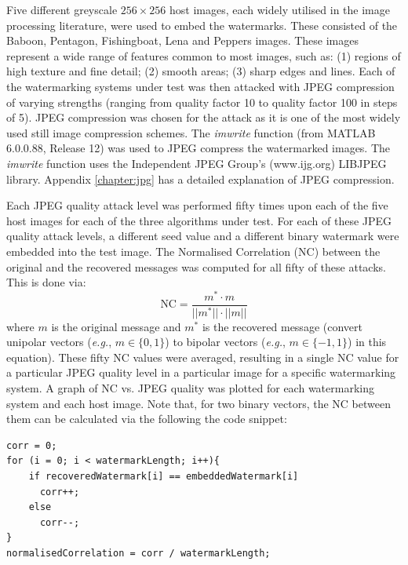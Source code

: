 \documentclass[12pt]{report}
\renewcommand{\baselinestretch}{1.5}
\begin{document}
Five different greyscale $256\times 256$ host images, each widely utilised in the image processing literature, were used to embed
the watermarks. 
These consisted of the Baboon, Pentagon, Fishingboat, Lena and Peppers images. These images represent a wide range of features
common to most images, such as: (1) regions of high texture and fine detail; (2) smooth areas; (3) sharp edges and lines.
Each of the watermarking systems under test was then attacked with JPEG compression 
of varying strengths (ranging from quality factor 10 to quality factor 100 in steps of 5). 
JPEG compression was chosen for the attack as it is one of the most widely used still image compression schemes.
The \emph{imwrite} function (from MATLAB 6.0.0.88, Release 12) was used
to JPEG compress the watermarked images. The \emph{imwrite} function uses the Independent JPEG Group's (www.ijg.org) LIBJPEG library.
Appendix \ref{chapter:jpg} has a detailed explanation of JPEG compression.

Each JPEG quality attack level was performed fifty times upon each of the five host images for each of the three algorithms under test. 
For each of these JPEG quality attack levels, a different seed value and a
different binary watermark were embedded into the test image. The Normalised Correlation (NC) between the original 
and the recovered messages was computed for all fifty of these attacks. This is done via:
\begin{equation}
\label{eq:nc}
	\mbox{NC}= \frac {m^{*} \cdot m} {||m^{*}|| \cdot ||m||}
\end{equation}
where $m$ is the original message and $m^{*}$ is the recovered message (convert unipolar vectors 
(\emph{e.g.}, $m\in\{0,1\}$)
to bipolar vectors (\emph{e.g.}, $m\in\{-1,1\}$) in this equation).
These fifty NC values were averaged, resulting in a single NC value for 
a particular JPEG quality level in a particular image for a 
specific watermarking system. A graph of NC vs. JPEG quality was plotted for each watermarking system and each host image.
Note that, for two binary vectors, the NC between them can be calculated via the following the code snippet:
\footnotesize
\renewcommand{\baselinestretch}{1}
\begin{verbatim}
corr = 0;
for (i = 0; i < watermarkLength; i++){
    if recoveredWatermark[i] == embeddedWatermark[i]
      corr++;
    else
      corr--;
}
normalisedCorrelation = corr / watermarkLength;
\end{verbatim}
\renewcommand{\baselinestretch}{1.5}
\normalsize
\end{document}
